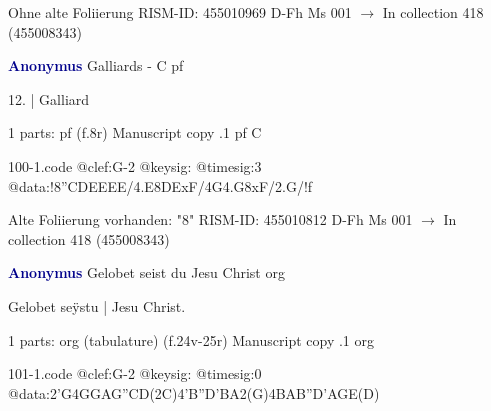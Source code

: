 \documentclass[twocolumn]{book}
\begin{document}
\newline Ohne alte Foliierung
\newline RISM-ID: 455010969
\newline D-Fh  Ms 001
\newline $\rightarrow$ In collection 418 (455008343)
      
\newline \par \vspace{7pt} \textcolor{darkblue}{\textbf{Anonymus  }}
\newline Galliards - C
\newline pf
\newline \begin{itshape}[f.8r, at left:] 12. | Galliard\end{itshape} 
\newline \textcolor{darkblue}{}  1 parts: pf  (f.8r)
\newline Manuscript copy
.1  pf  C  
\begin{filecontents*}{100-1.code}
@clef:G-2
@keysig:
@timesig:3
@data:!{8''CDEEEE}/4.E{8DExF}/4G4.G8xF/2.G/!f
\end{filecontents*}
\newline
%

\newline Alte Foliierung vorhanden: "8"
\newline RISM-ID: 455010812
\newline D-Fh  Ms 001
\newline $\rightarrow$ In collection 418 (455008343)
      
\newline \par \vspace{7pt} \textcolor{darkblue}{\textbf{Anonymus  }}
\newline Gelobet seist du Jesu Christ
\newline org
\newline \begin{itshape}[f.24v, at left:] Gelobet seÿstu | Jesu Christ.\end{itshape} 
\newline \textcolor{darkblue}{}  1 parts: org (tabulature)  (f.24v-25r)
\newline Manuscript copy
.1  org  
\begin{filecontents*}{101-1.code}
@clef:G-2
@keysig:
@timesig:0
@data:2'G4GGAG''CD(2C)4'B''D'BA2(G)4BAB''D'AGE(D)
\end{filecontents*}
\newline
%
\end{document}
